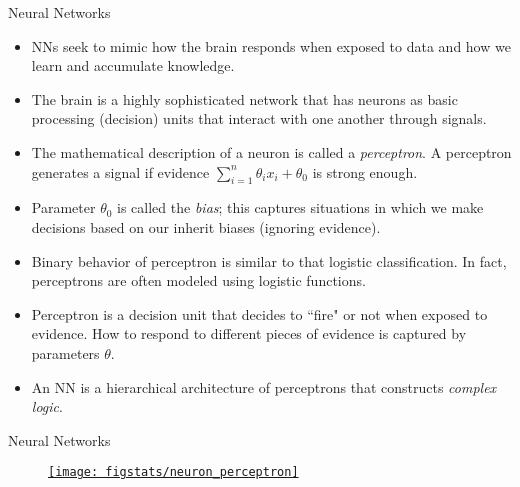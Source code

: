 \documentclass[9pt]{beamer}
\begin{document}

\begin{frame}{Neural Networks}

\begin{itemize}
   \setlength{\itemsep}{5pt}
\item NNs seek to mimic how the brain responds when exposed to data and how we learn and accumulate knowledge. 

\item The brain is a highly sophisticated network that has neurons as basic processing (decision) units that interact with one another through signals. 

\item  The mathematical description of a neuron is called a {\em perceptron}. A perceptron generates a signal if evidence $\sum_{i=1}^n\theta_ix_i+\theta_0$ is strong enough. 

\item Parameter $\theta_0$ is called the {\em bias}; this captures situations in which we make decisions based on our inherit biases (ignoring evidence). 

\item Binary behavior of perceptron is similar to that logistic classification. In fact, perceptrons are often modeled using logistic functions. 

\item Perceptron is a decision unit that decides to ``fire" or not when exposed to evidence. How to respond to different pieces of evidence is captured by parameters $\theta$.   
 
\item An NN is a hierarchical architecture of perceptrons that constructs {\em complex logic}. 
\end{itemize}

\end{frame}


\begin{frame}{Neural Networks}

\begin{figure}[!htb]
    \centering
	\href{http://dataskunkworks.com/2018/03/22/building-an-artificial-neuron-in-python-the-perceptron}{\texttt{[image: figstats/neuron\_perceptron]}}
\end{figure}

\end{frame}
\end{document}
